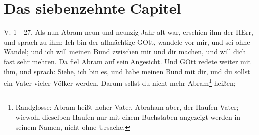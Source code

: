 \section{Das siebenzehnte Capitel}

\begin{schriftzitat}
V. 1—27. Als nun Abram neun und neunzig Jahr alt war, erschien ihm der HErr, und sprach zu ihm: Ich bin der allmächtige GOtt, wandele vor mir, und sei ohne Wandel; und ich will meinen Bund zwischen mir und dir machen, und will dich fast sehr mehren. Da fiel Abram auf sein Angesicht. Und GOtt redete weiter mit ihm, und sprach: Siehe, ich bin es, und habe meinen Bund mit dir, und du sollst ein Vater vieler Völker werden. Darum sollst du nicht mehr Abram\footnote{Randglosse: Abram heißt hoher Vater, Abraham aber, der Haufen Vater; wiewohl dieselben Haufen nur mit einem Buchstaben angezeigt werden in seinem Namen, nicht ohne Ursache.} heißen;


\end{schriftzitat}
